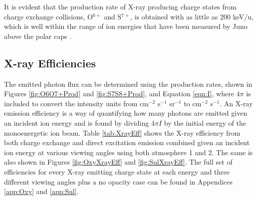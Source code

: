 \documentclass[draft]{agujournal2018}
\begin{document}
It is evident that the production rate of X-ray producing charge states from charge exchange collisions, O$^{6+}$ and S$^{7+}$, is obtained with as little as 200 keV/u, which is well within the range of ion energies that have been measured by Juno above the polar caps \citep{haggerty2017,clark2017a,clark2017b}.


\subsection{X-ray Efficiencies}

The emitted photon flux can be determined using the production rates, shown in Figures \ref{fig:O6O7+Prod} and \ref{fig:S7S8+Prod}, and Equation \ref{eqn:I}, where $4\pi$ is included to convert the intensity units from cm$^{-2}$ s$^{-1}$ sr$^{-1}$ to cm$^{-2}$ s$^{-1}$.
An X-ray emission efficiency is a way of quantifying how many photons are emitted given an incident ion energy and is found by dividing $4\pi I$ by the initial energy of the monoenergetic ion beam.
Table \ref{tab:XrayEff} shows the X-ray efficiency from both charge exchange and direct excitation emission combined given an incident ion energy at various viewing angles using both atmosphere 1 and 2.
The same is also shown in Figures \ref{fig:OxyXrayEff} and \ref{fig:SulXrayEff}.
The full set of efficiencies for every X-ray emitting charge state at each energy and three different viewing angles plus a no opacity case can be found in Appendices \ref{app:Oxy} and \ref{app:Sul}.
\end{document}
